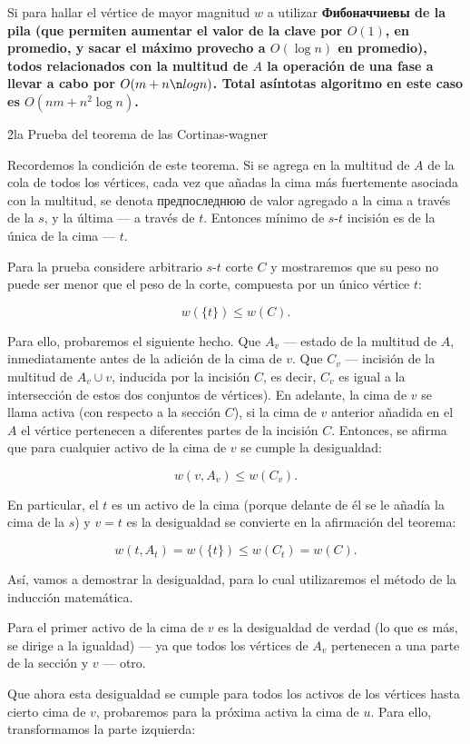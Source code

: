 Si para hallar el vértice de mayor magnitud $w$ a utilizar \bf{Фибоначчиевы de la pila} (que permiten aumentar el valor de la clave por $O(1)$, en promedio, y sacar el máximo provecho a $O(\log n)$ en promedio), todos relacionados con la multitud de $A$ la operación de una fase a llevar a cabo por $O(m + n \n log n)$. Total asíntotas algoritmo en este caso es $O(n m + n^2 \log n)$.


\h2{la Prueba del teorema de las Cortinas-wagner}

Recordemos la condición de este teorema. Si se agrega en la multitud de $A$ de la cola de todos los vértices, cada vez que añadas la cima más fuertemente asociada con la multitud, se denota предпоследнюю de valor agregado a la cima a través de la $s$, y la última --- a través de $t$. Entonces mínimo de $s$-$t$ incisión es de la única de la cima --- $t$.

Para la prueba considere arbitrario $s$-$t$ corte $C$ y mostraremos que su peso no puede ser menor que el peso de la corte, compuesta por un único vértice $t$:

$$ w(\{t\}) \le w(C). $$

Para ello, probaremos el siguiente hecho. Que $A_v$ --- estado de la multitud de $A$, inmediatamente antes de la adición de la cima de $v$. Que $C_v$ --- incisión de la multitud de $A_v \cup v$, inducida por la incisión $C$, es decir, $C_v$ es igual a la intersección de estos dos conjuntos de vértices). En adelante, la cima de $v$ se llama activa (con respecto a la sección $C$), si la cima de $v$ anterior añadida en el $A$ el vértice pertenecen a diferentes partes de la incisión $C$. Entonces, se afirma que para cualquier activo de la cima de $v$ se cumple la desigualdad:

$$ w(v,A_v) \le w(C_v). $$

En particular, el $t$ es un activo de la cima (porque delante de él se le añadía la cima de la $s$) y $v = t$ es la desigualdad se convierte en la afirmación del teorema:

$$ w(t,A_t) = w(\{t\}) \le w(C_t) = w(C). $$

Así, vamos a demostrar la desigualdad, para lo cual utilizaremos el método de la inducción matemática.

Para el primer activo de la cima de $v$ es la desigualdad de verdad (lo que es más, se dirige a la igualdad) --- ya que todos los vértices de $A_v$ pertenecen a una parte de la sección y $v$ --- otro.

Que ahora esta desigualdad se cumple para todos los activos de los vértices hasta cierto cima de $v$, probaremos para la próxima activa la cima de $u$. Para ello, transformamos la parte izquierda:

